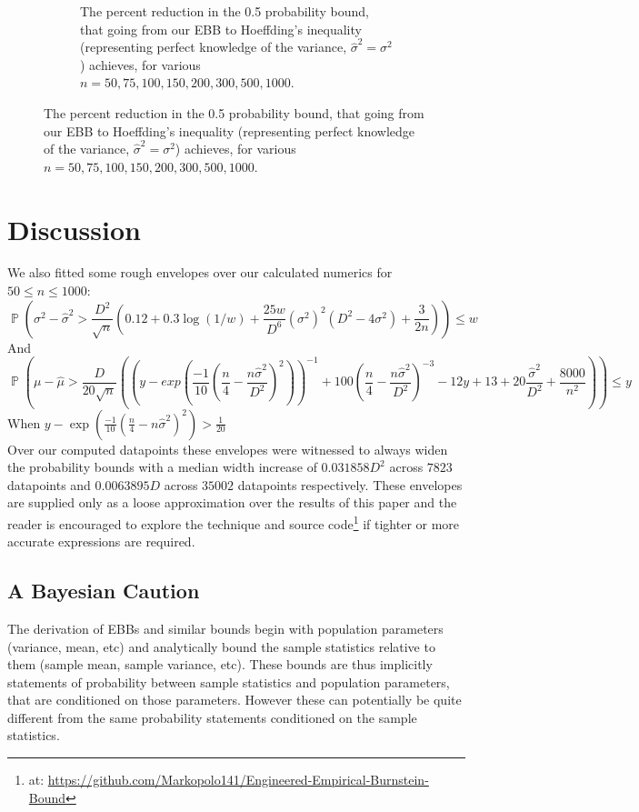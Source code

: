 \documentclass[aap,preprint]{imsart}
\DeclareMathOperator{\p}{\mathbb{P}}
\begin{document}
\begin{figure}[]
\begin{subfigure}[b]{.76\linewidth}
		\caption{The percent reduction in the 0.5 probability bound, that going from our EBB to Hoeffding's inequality (representing perfect knowledge of the variance, $\hat{\sigma}^2=\sigma^2$) achieves, for various $n=50,75,100,150,200,300,500,1000$.}
		\label{biggraph4}
    \end{subfigure}
\end{figure}


\section{Discussion}\label{discussion}
We also fitted some rough envelopes over our calculated numerics for $50\le n\le 1000$:
$$\scriptstyle \p\left(\sigma^2 - \hat{\sigma}^2>\frac{D^2}{\sqrt{n}}\left(0.12+0.3\log(1/w)+\frac{25w}{D^6}(\sigma^2)^2(D^2-4\sigma^2)+\frac{3}{2n}\right)\right) \le w$$
And
$$\scriptstyle \p\left(\mu - \hat{\mu}>\frac{D}{20\sqrt{n}}\left(\left(y-exp\left(\frac{-1}{10}\left(\frac{n}{4}-\frac{n\hat{\sigma}^2}{D^2}\right)^2\right)\right)^{-1}+ 100\left(\frac{n}{4}-\frac{n\hat{\sigma}^2}{D^2}\right)^{-3} -12y+13+20\frac{\hat{\sigma}^2}{D^2} +\frac{8000}{n^2}\right)\right) \le y$$
\hfill When $\scriptstyle y-\exp\left(\frac{-1}{10}(\frac{n}{4}-n\hat{\sigma}^2)^2\right)>\frac{1}{20}$\\

Over our computed datapoints these envelopes were witnessed to always widen the probability bounds with a median width increase of $0.031858D^2$ across $7823$ datapoints and $0.0063895D$ across $35002$ datapoints respectively.
These envelopes are supplied only as a loose approximation over the results of this paper and the reader is encouraged to explore the technique and source code\footnote{at: \href{https://github.com/Markopolo141/Engineered-Empirical-Burnstein-Bound}{https://github.com/Markopolo141/Engineered-Empirical-Burnstein-Bound}} if tighter or more accurate expressions are required.


 



\subsection{A Bayesian Caution}
The derivation of EBBs and similar bounds begin with population parameters (variance, mean, etc) and analytically bound the sample statistics relative to them (sample mean, sample variance, etc).
These bounds are thus implicitly statements of probability between sample statistics and population parameters, that are conditioned on those parameters.
However these can potentially be quite different from the same probability statements conditioned on the sample statistics.
\end{document}
